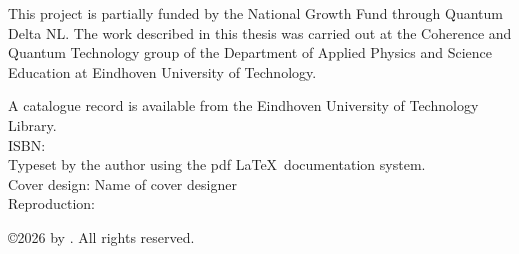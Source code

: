\newpage
\thispagestyle{empty}

\vspace*{\fill}

\small\noindent This project is partially funded by the National Growth Fund through Quantum Delta NL. The work described in this thesis was carried out at the Coherence and Quantum Technology group of the Department of Applied Physics and Science Education at Eindhoven University of
Technology. 

\vspace{\baselineskip}

{\noindent\small
A catalogue record is available from the Eindhoven University of Technology Library.\\
ISBN: \isbn\\[4mm]
Typeset by the author using the pdf \LaTeX \ documentation system.\\
Cover design: Name of cover designer \\
Reproduction: \printer

\vspace{\baselineskip}
\noindent \copyright 2026 by \@author. All rights reserved.}
